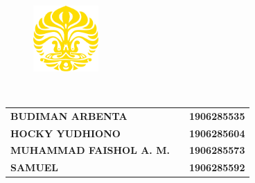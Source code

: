 %

%
%

\begin{titlepage}
    \begin{center}
        \begin{figure}
            \begin{center}
                \includegraphics[width=2.5cm]{assets/pics/makara_kuning.png}
            \end{center}
        \end{figure}
        \vspace*{0cm}

        \vspace*{1.0cm}
        \bo{\Judul} \\[1.0cm]

        \vspace*{2 cm}
        \bo{\Type}

        \vspace*{2 cm}

            \begin{table}[H]\centering
\begin{tabular}{llr}
\textbf{BUDIMAN ARBENTA}                  &  & \textbf{1906285535} \\
\textbf{HOCKY YUDHIONO}                   &  & \textbf{1906285604} \\
\textbf{MUHAMMAD FAISHOL A. M.} &  & \textbf{1906285573} \\
\textbf{SAMUEL}                           &  & \textbf{1906285592}
        \end{tabular}
        \end{table}

        \vspace*{5.0cm}

    \end{center}
\end{titlepage}

